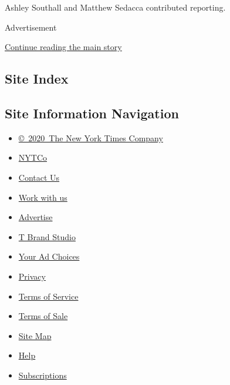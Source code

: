 Ashley Southall and Matthew Sedacca contributed reporting.

Advertisement

\protect\hyperlink{after-bottom}{Continue reading the main story}

\hypertarget{site-index}{%
\subsection{Site Index}\label{site-index}}

\hypertarget{site-information-navigation}{%
\subsection{Site Information
Navigation}\label{site-information-navigation}}

\begin{itemize}
\tightlist
\item
  \href{https://help.nytimes3xbfgragh.onion/hc/en-us/articles/115014792127-Copyright-notice}{©~2020~The
  New York Times Company}
\end{itemize}

\begin{itemize}
\tightlist
\item
  \href{https://www.nytco.com/}{NYTCo}
\item
  \href{https://help.nytimes3xbfgragh.onion/hc/en-us/articles/115015385887-Contact-Us}{Contact
  Us}
\item
  \href{https://www.nytco.com/careers/}{Work with us}
\item
  \href{https://nytmediakit.com/}{Advertise}
\item
  \href{http://www.tbrandstudio.com/}{T Brand Studio}
\item
  \href{https://www.nytimes3xbfgragh.onion/privacy/cookie-policy\#how-do-i-manage-trackers}{Your
  Ad Choices}
\item
  \href{https://www.nytimes3xbfgragh.onion/privacy}{Privacy}
\item
  \href{https://help.nytimes3xbfgragh.onion/hc/en-us/articles/115014893428-Terms-of-service}{Terms
  of Service}
\item
  \href{https://help.nytimes3xbfgragh.onion/hc/en-us/articles/115014893968-Terms-of-sale}{Terms
  of Sale}
\item
  \href{https://spiderbites.nytimes3xbfgragh.onion}{Site Map}
\item
  \href{https://help.nytimes3xbfgragh.onion/hc/en-us}{Help}
\item
  \href{https://www.nytimes3xbfgragh.onion/subscription?campaignId=37WXW}{Subscriptions}
\end{itemize}
